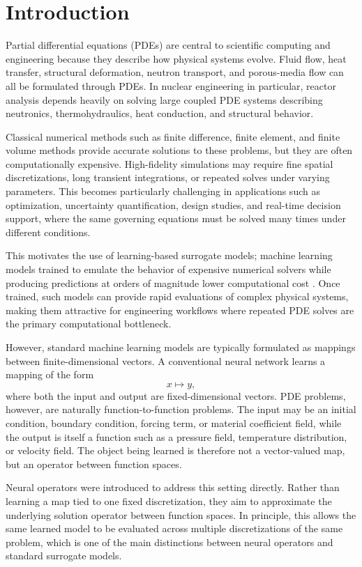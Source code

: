 \chapter{\label{cha:intro}Introduction}

Partial differential equations (PDEs) are central to scientific computing and engineering because they describe how physical systems evolve. Fluid flow, heat transfer, structural deformation, neutron transport, and porous-media flow can all be formulated through PDEs. In nuclear engineering in particular, reactor analysis depends heavily on solving large coupled PDE systems describing neutronics, thermohydraulics, heat conduction, and structural behavior.

Classical numerical methods such as finite difference, finite element, and finite volume methods provide accurate solutions to these problems, but they are often computationally expensive. High-fidelity simulations may require fine spatial discretizations, long transient integrations, or repeated solves under varying parameters. This becomes particularly challenging in applications such as optimization, uncertainty quantification, design studies, and real-time decision support, where the same governing equations must be solved many times under different conditions.

This motivates the use of learning-based surrogate models; machine learning models trained to emulate the behavior of expensive numerical solvers while producing predictions at orders of magnitude lower computational cost \cite{ml-good}. Once trained, such models can provide rapid evaluations of complex physical systems, making them attractive for engineering workflows where repeated PDE solves are the primary computational bottleneck.

However, standard machine learning models are typically formulated as mappings between finite-dimensional vectors. A conventional neural network learns a mapping of the form
\[
x \mapsto y,
\]
where both the input and output are fixed-dimensional vectors. PDE problems, however, are naturally function-to-function problems. The input may be an initial condition, boundary condition, forcing term, or material coefficient field, while the output is itself a function such as a pressure field, temperature distribution, or velocity field. The object being learned is therefore not a vector-valued map, but an operator between function spaces.

Neural operators were introduced to address this setting directly. Rather than learning a map tied to one fixed discretization, they aim to approximate the underlying solution operator between function spaces. In principle, this allows the same learned model to be evaluated across multiple discretizations of the same problem, which is one of the main distinctions between neural operators and standard surrogate models.

